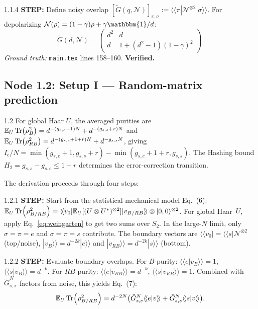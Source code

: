 \documentclass[11pt,a4paper]{article}
\newcommand{\Ic}{I_{\mathrm{c}}}
\newcommand{\Noise}{\mathcal{N}}
\newcommand{\Ex}{\mathbb{E}}
\begin{document}
\begin{proofnode}{1.1.4}
\textbf{STEP:} Define noisy overlap $[\tilde{G}(q,\Noise)]_{\pi,\sigma} := \langle\!\langle\pi|\Noise^{\otimes 2}|\sigma\rangle\!\rangle$. For depolarizing $\Noise(\rho)=(1-\gamma)\rho+\gamma\mathbbm{1}/d$:
\begin{equation}
    \tilde{G}(d,\Noise) = \begin{pmatrix} d^2 & d \\ d & 1+(d^2-1)(1-\gamma)^2 \end{pmatrix}.
    \label{eq:noisy_gram}
\end{equation}
\textit{Ground truth:} \texttt{main.tex} lines 158--160. \textbf{Verified.}
\end{proofnode}

\subsection{Node 1.2: Setup I --- Random-matrix prediction}
\label{sec:node12}

\begin{proofnode}{1.2}
For global Haar $U$, the averaged purities are $\Ex_U \Tr(\rho_B^2) = d^{-(g_{s,e}+1)N} + d^{-(g_{s,s}+r)N}$ and $\Ex_U \Tr(\rho_{RB}^2) = d^{-(g_{s,e}+1+r)N} + d^{-g_{s,s}N}$, giving $\Ic/N = \min(g_{s,e}+1, g_{s,s}+r) - \min(g_{s,e}+1+r, g_{s,s})$. The Hashing bound $H_2 = g_{s,s} - g_{s,e} \leq 1-r$ determines the error-correction transition.
\end{proofnode}

The derivation proceeds through four steps:

\begin{proofnode}{1.2.1}
\textbf{STEP:} Start from the statistical-mechanical model Eq.~(6): $\Ex_U \Tr(\rho_{B/RB}^2) = \langle\!\langle v_0| \Ex_U[(U\otimes U^*)^{\otimes 2}] |v_{B/RB}\rangle\!\rangle \otimes |0,0\rangle^{\otimes 2}$. For global Haar~$U$, apply Eq.~\eqref{eq:weingarten} to get two sums over $S_2$. In the large-$N$ limit, only $\sigma=\pi=e$ and $\sigma=\pi=s$ contribute. The boundary vectors are $\langle\!\langle v_0| = \langle\!\langle s|\Noise^{\otimes 2}$ (top/noise), $|v_B\rangle\!\rangle = d^{-2k}|e\rangle\!\rangle$ and $|v_{RB}\rangle\!\rangle = d^{-2k}|s\rangle\!\rangle$ (bottom).
\end{proofnode}

\begin{proofnode}{1.2.2}
\textbf{STEP:} Evaluate boundary overlaps. For $B$-purity: $\langle\!\langle e|v_B\rangle\!\rangle = 1$, $\langle\!\langle s|v_B\rangle\!\rangle = d^{-k}$. For $RB$-purity: $\langle\!\langle e|v_{RB}\rangle\!\rangle = d^{-k}$, $\langle\!\langle s|v_{RB}\rangle\!\rangle = 1$. Combined with $\tilde{G}_{s,\pi}^N$ factors from noise, this yields Eq.~(7):
\begin{equation}
    \Ex_U \Tr(\rho_{B/RB}^2) = d^{-2N}\bigl(\tilde{G}_{s,e}^N \langle\!\langle e|v\rangle\!\rangle + \tilde{G}_{s,s}^N \langle\!\langle s|v\rangle\!\rangle\bigr).
    \label{eq:stat_model_2}
\end{equation}
\end{proofnode}
\end{document}
